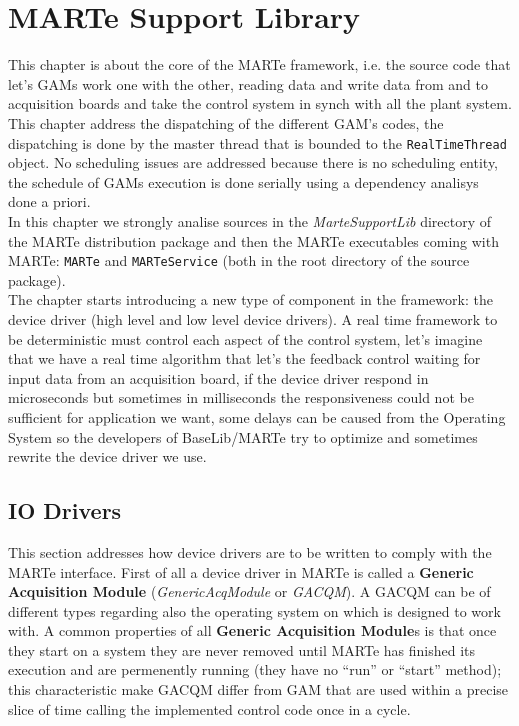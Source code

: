 \chapter{MARTe Support Library}


This chapter is about the core of the MARTe framework, i.e. the source code that let's GAMs work one with the other, reading data and write data from and to acquisition boards and take the control system in synch with all the plant system. This chapter address the dispatching of the different GAM's codes, the dispatching is done by the master thread that is bounded to the \texttt{RealTimeThread} object. No scheduling issues are addressed because there is no scheduling entity, the schedule of GAMs execution is done serially using a dependency analisys done a priori. \\


In this chapter we strongly analise sources in the \textit{MarteSupportLib} directory of the MARTe distribution package and then the MARTe executables coming with MARTe: \texttt{MARTe} and \texttt{MARTeService} (both in the root directory of the source package). \\


The chapter starts introducing a new type of component in the framework: the device driver (high level and low level device drivers). A real time framework to be deterministic must control each aspect of the control system, let's imagine that we have a real time algorithm that let's the feedback control waiting for input data from an acquisition board, if the device driver respond in microseconds but sometimes in milliseconds the responsiveness could not be sufficient for application we want, some delays can be caused from the Operating System so the developers of BaseLib/MARTe try to optimize and sometimes rewrite the device driver we use. \\



\section{IO Drivers}

This section addresses how device drivers are to be written to comply with the MARTe interface. First of all a device driver in MARTe is called a \textbf{Generic Acquisition Module} (\textit{GenericAcqModule} or \textit{GACQM}). A GACQM can be of different types regarding also the operating system on which is designed to work with. A common properties of all \textbf{Generic Acquisition Module}s is that once they start on a system they are never removed until MARTe has finished its execution and are permenently running (they have no ``run'' or ``start'' method); this characteristic make GACQM differ from GAM that are used within a precise slice of time calling the implemented control code once in a cycle. \\

